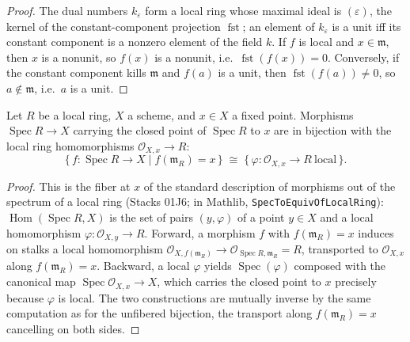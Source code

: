 \begin{proof}\leanok
  The dual numbers \(k_\varepsilon\) form a local ring whose maximal
  ideal is \((\varepsilon)\), the kernel of the constant-component
  projection \(\operatorname{fst}\); an element of
  \(k_\varepsilon\) is a unit iff its constant component is a nonzero
  element of the field \(k\). If \(f\) is local and
  \(x \in \mathfrak m\), then \(x\) is a nonunit, so \(f(x)\) is a
  nonunit, i.e.\ \(\operatorname{fst}(f(x)) = 0\). Conversely, if the
  constant component kills \(\mathfrak m\) and \(f(a)\) is a unit,
  then \(\operatorname{fst}(f(a)) \neq 0\), so \(a \notin \mathfrak m\),
  i.e.\ \(a\) is a unit.
\end{proof}

\begin{lemma}\leanok
  \label{lem:tangent_spec_local_ring_at}
  Let \(R\) be a local ring, \(X\) a scheme, and \(x \in X\) a fixed
  point. Morphisms \(\operatorname{Spec} R \to X\) carrying the closed
  point of \(\operatorname{Spec} R\) to \(x\) are in bijection with the
  local ring homomorphisms \(\mathcal O_{X,x} \to R\):
  \[
    \{\, f : \operatorname{Spec} R \to X \mid f(\mathfrak m_R) = x \,\}
    \;\cong\;
    \{\, \varphi : \mathcal O_{X,x} \to R \ \text{local} \,\}.
  \]
\end{lemma}

\begin{proof}\leanok
  This is the fiber at \(x\) of the standard description of morphisms
  out of the spectrum of a local ring (Stacks 01J6; in Mathlib,
  \texttt{SpecToEquivOfLocalRing}):
  \(\operatorname{Hom}(\operatorname{Spec} R, X)\) is the set of pairs
  \((y, \varphi)\) of a point \(y \in X\) and a local homomorphism
  \(\varphi : \mathcal O_{X,y} \to R\). Forward, a morphism \(f\) with
  \(f(\mathfrak m_R) = x\) induces on stalks a local homomorphism
  \(\mathcal O_{X,f(\mathfrak m_R)} \to \mathcal O_{\operatorname{Spec} R,\mathfrak m_R}
    = R\), transported to \(\mathcal O_{X,x}\) along
  \(f(\mathfrak m_R) = x\). Backward, a local \(\varphi\) yields
  \(\operatorname{Spec}(\varphi)\) composed with the canonical map
  \(\operatorname{Spec} \mathcal O_{X,x} \to X\), which carries the
  closed point to \(x\) precisely because \(\varphi\) is local. The
  two constructions are mutually inverse by the same computation as
  for the unfibered bijection, the transport along \(f(\mathfrak m_R) = x\)
  cancelling on both sides.
\end{proof}

